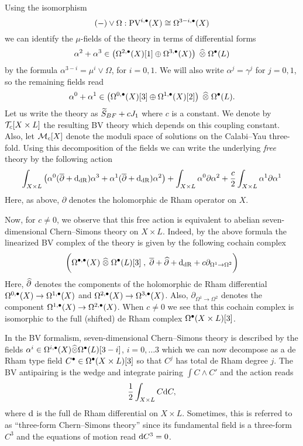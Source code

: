 \documentclass[11pt]{amsart}
\def\PV{{\rm PV}}
\begin{document}
Using the isomorphism
\[
 (-) \vee \Omega : \PV^{i,\bu} (X) \cong \Omega^{3-i, \bu}(X)
\]
we can identify the $\mu$-fields of the theory in terms of differential forms
\[
  \alpha^2 + \alpha^3 \in \left(\Omega^{2,\bu}(X)[1] \oplus \Omega^{3,\bu}(X)\right) \; \Hat{\otimes} \; \Omega^\bu(L)
\]
by the formula $\alpha^{3-i} = \mu^{i} \vee \Omega$, for $i=0,1$.
We will also write $\alpha^{j} = \gamma^{j}$ for $j=0,1$, so the remaining fields read
\[
  \alpha^0 + \alpha^1 \in \left(\Omega^{0,\bu}(X)[3] \oplus \Omega^{1,\bu}(X)[2] \right) \; \Hat{\otimes} \; \Omega^\bu (L).
\]
Let us write the theory as $\Tilde{S}_{BF} + c J_1$ where $c$ is a constant.
We denote by $\cT_c [X \times L]$ the resulting BV theory which depends on this coupling constant.
Also, let $\cM_c[X]$ denote the moduli space of solutions on the Calabi--Yau three-fold.
Using this decomposition of the fields we can write the underlying {\em free} theory by the following action
\[
  \int_{X\times L} \left(\alpha^0 (\dbar + \d_{\rm dR}) \alpha^3 + \alpha^1 (\dbar + \d_{\rm dR}) \alpha^2 \right) + \int_{X \times L} \alpha^0 \partial \alpha^2 + \frac{c}{2} \int_{X \times L} \alpha^1 \partial \alpha^1
\]
Here, as above, $\partial$ denotes the holomorphic de Rham operator on $X$.

Now, for $c \ne 0$, we observe that this free action is equivalent to abelian seven-dimensional Chern--Simons theory on $X \times L$.
Indeed, by the above formula the linearized BV complex of the theory is given by the following cochain complex
\[
  \bigg(\Omega^{\bu, \bu} (X) \; \Hat{\otimes} \; \Omega^{\bu}(L) [3] \; , \; \dbar + \Hat{\partial} + \d_{\rm dR} + c \partial_{\Omega^{1} \to \Omega^{2}} \bigg)
\]
Here, $\Hat{\partial}$ denotes the components of the holomorphic de Rham differential $\Omega^{0,\bu}(X) \to \Omega^{1,\bu}(X)$ and $\Omega^{2,\bu}(X) \to \Omega^{3,\bu}(X)$.
Also, $\partial_{\Omega^1 \to \Omega^2}$ denotes the component $\Omega^{1,\bu}(X) \to \Omega^{2,\bu}(X)$.
When $c \ne 0$ we see that this cochain complex is isomorphic to the full (shifted) de Rham complex $\Omega^\bu(X \times L)[3]$.

In the BV formalism, seven-dimensional Chern--Simons theory is described by the fields $\alpha^i \in \Omega^{i,\bu}(X) \Hat{\otimes} \Omega^\bu(L)[3-i]$, $i=0, \ldots 3$ which we can now decompose as a de Rham type field $C^\bu \in \Omega^\bu(X \times L)[3]$ so that $C^j$ has total de Rham degree $j$.
The BV antipairing is the wedge and integrate pairing $\int C \wedge C'$ and the action reads
\[
  \frac{1}{2} \int_{X \times L} C \d C,
\]
where $\d$ is the full de Rham differential on $X \times L$.
Sometimes, this is referred to as ``three-form Chern--Simons theory'' since its fundamental field is a three-form $C^3$ and the equations of motion read $\d C^3 = 0$.
\end{document}
